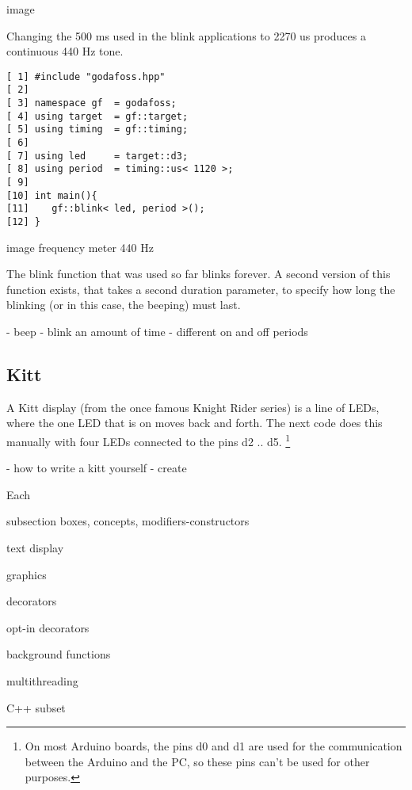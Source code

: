 \documentclass{article}
\begin{document}
image

Changing the 500 ms used in the blink applications to 2270 us produces
a continuous 440 Hz tone.

\lstset {language=C++}
\begin{lstlisting}
[ 1] #include "godafoss.hpp"
[ 2]
[ 3] namespace gf  = godafoss;
[ 4] using target  = gf::target;
[ 5] using timing  = gf::timing;
[ 6]
[ 7] using led     = target::d3;
[ 8] using period  = timing::us< 1120 >;
[ 9]
[10] int main(){
[11]    gf::blink< led, period >();
[12] }
\end{lstlisting}

image frequency meter 440 Hz

The blink function that was used so far blinks forever.
A second version of this function exists, that takes a second
duration parameter, to specify how long the blinking
(or in this case, the beeping) must last.


- beep
- blink an amount of time
- different on and off periods

\subsection{Kitt}

A Kitt display (from the once famous Knight Rider series) is a line
of LEDs, where the one LED that is on moves back and forth.
The next code does this manually with four LEDs connected to the pins
d2 .. d5.
\footnote{On most Arduino boards, the pins d0 and d1 are used
for the communication between the Arduino and the PC, so these pins
can't be used for other purposes.}



- how to write a kitt yourself
   - create

Each

subsection boxes, concepts, modifiers-constructors

text display

graphics

decorators

opt-in decorators

background functions

multithreading

C++ subset



\end{document}
